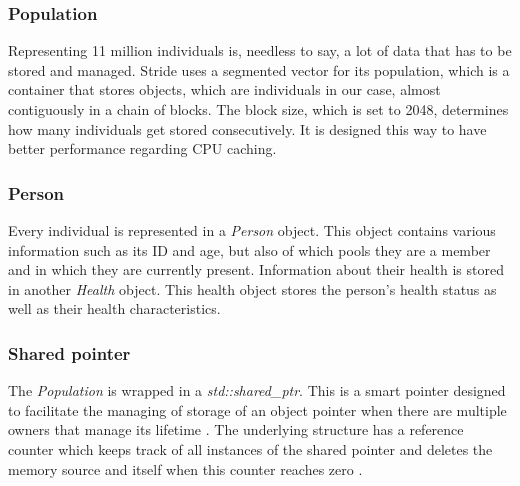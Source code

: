 \subsubsection{Population}
Representing 11 million individuals is, needless to say, a lot of data that has to be stored and managed. Stride uses a segmented vector for its population, which is a container that stores objects, which are individuals in our case, almost contiguously in a chain of blocks. The block size, which is set to 2048, determines how many individuals get stored consecutively. It is designed this way to have better performance regarding CPU caching.

\subsubsection{Person}
Every individual is represented in a \textit{Person} object. This object contains various information such as its ID and age, but also of which pools they are a member and in which they are currently present. Information about their health is stored in another \textit{Health} object. This health object stores the person's health status as well as their health characteristics.

\subsubsection{Shared pointer}
The \textit{Population} is wrapped in a \textit{std::shared\_ptr}. This is a smart pointer designed to facilitate the managing of storage of an object pointer when there are multiple owners that manage its lifetime \cite{shared_ptr_doc}. The underlying structure has a reference counter which keeps track of all instances of the shared pointer and deletes the memory source and itself when this counter reaches zero \cite{shared_ptr_doc_microsoft}.


